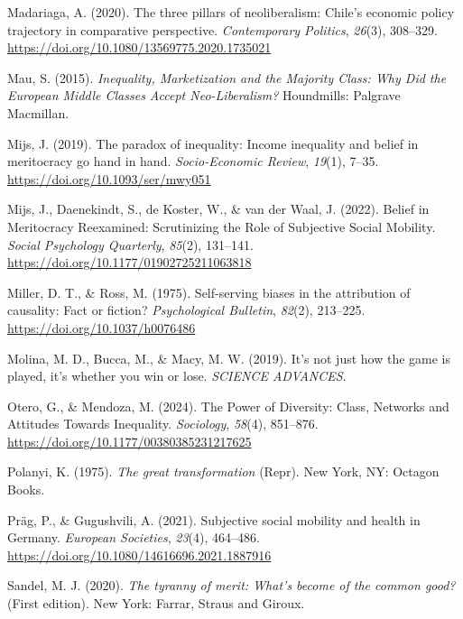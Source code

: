 \documentclass[
  13pt,
]{article}
\newlength{\cslhangindent}
\newenvironment{CSLReferences}[2] %
 {\begin{list}{}{%
  \setlength{\itemindent}{0pt}
  \setlength{\leftmargin}{0pt}
  \setlength{\parsep}{0pt}
  \ifodd #1
   \setlength{\leftmargin}{\cslhangindent}
   \setlength{\itemindent}{-1\cslhangindent}
  \fi
  \setlength{\itemsep}{#2\baselineskip}}}
 {\end{list}}
\begin{document}
\begin{CSLReferences}{1}{0}
Madariaga, A. (2020). The three pillars of neoliberalism: {Chile}'s
economic policy trajectory in comparative perspective.
\emph{Contemporary Politics}, \emph{26}(3), 308--329.
\url{https://doi.org/10.1080/13569775.2020.1735021}

Mau, S. (2015). \emph{Inequality, {Marketization} and the {Majority
Class}: {Why Did} the {European Middle Classes Accept Neo-Liberalism}?}
Houndmills: Palgrave Macmillan.

Mijs, J. (2019). The paradox of inequality: Income inequality and belief
in meritocracy go hand in hand. \emph{Socio-Economic Review},
\emph{19}(1), 7--35. \url{https://doi.org/10.1093/ser/mwy051}

Mijs, J., Daenekindt, S., de Koster, W., \& van der Waal, J. (2022).
Belief in {Meritocracy Reexamined}: {Scrutinizing} the {Role} of
{Subjective Social Mobility}. \emph{Social Psychology Quarterly},
\emph{85}(2), 131--141. \url{https://doi.org/10.1177/01902725211063818}

Miller, D. T., \& Ross, M. (1975). Self-serving biases in the
attribution of causality: {Fact} or fiction? \emph{Psychological
Bulletin}, \emph{82}(2), 213--225.
\url{https://doi.org/10.1037/h0076486}

Molina, M. D., Bucca, M., \& Macy, M. W. (2019). It's not just how the
game is played, it's whether you win or lose. \emph{SCIENCE ADVANCES}.

Otero, G., \& Mendoza, M. (2024). The {Power} of {Diversity}: {Class},
{Networks} and {Attitudes Towards Inequality}. \emph{Sociology},
\emph{58}(4), 851--876. \url{https://doi.org/10.1177/00380385231217625}

Polanyi, K. (1975). \emph{The great transformation} (Repr). New York,
NY: Octagon Books.

Präg, P., \& Gugushvili, A. (2021). Subjective social mobility and
health in {Germany}. \emph{European Societies}, \emph{23}(4), 464--486.
\url{https://doi.org/10.1080/14616696.2021.1887916}

Sandel, M. J. (2020). \emph{The tyranny of merit: {What}'s become of the
common good?} (First edition). New York: {Farrar, Straus and Giroux}.


\end{CSLReferences}
\end{document}
